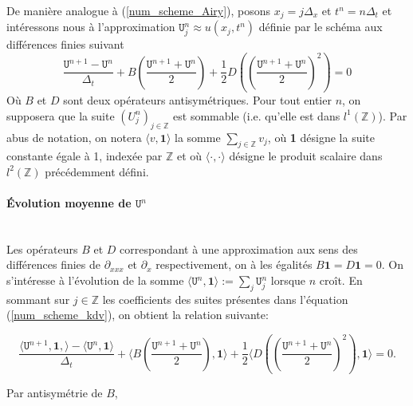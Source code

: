 \documentclass[12pt,a4paper]{article}
\numberwithin{equation}{section}
\begin{document}
De manière analogue à (\ref{num_scheme_Airy}), posons $x_j = j\Delta_x$ et $t^n = n\Delta_t$  et intéressons nous à l'approximation $\texttt{U}^n_j \approx u(x_j,t^n)$ définie par le schéma aux différences finies suivant
\begin{equation}
\frac{\texttt{U}^{n+1}-\texttt{U}^n}{\Delta_t} + B\left(\frac{\texttt{U}^{n+1} + \texttt{U}^{n}}{2}\right) + \frac{1}{2}D\left( \left(\frac{\texttt{U}^{n+1} + \texttt{U}^{n}}{2}\right)^2 \right) = 0 \label{num_scheme_kdv}
\end{equation}
Où $B$ et $D$ sont deux opérateurs antisymétriques. Pour tout entier $n$, on supposera que la suite $(U^n_j)_{j\in\mathbb{Z}}$ est sommable (i.e. qu'elle est dans $l^1(\mathbb{Z})$). Par abus de notation, on notera $\langle v,\textbf{1}\rangle$ la somme $\sum_{j\in\mathbb{Z}}v_j$, où \textbf{1} désigne la suite constante égale à 1, indexée par $\mathbb{Z}$ et où $\langle \cdot,\cdot\rangle$ désigne le produit scalaire dans $l^2(\mathbb{Z})$ précédemment défini.

\paragraph{Évolution moyenne de $\texttt{U}^n$}\,\\

Les opérateurs $B$ et $D$ correspondant à une approximation aux sens des différences finies de $\partial_{xxx}$ et $\partial_x$ respectivement, on à les égalités $B\textbf{1} = D\textbf{1} = 0 $. On s'intéresse à l'évolution de la somme $\langle \texttt{U}^n,\textbf{1}\rangle  := \sum_j \texttt{U}_j^n$ lorsque $n$ croît. En sommant sur $j\in\mathbb{Z}$ les coefficients des suites présentes dans l'équation (\ref{num_scheme_kdv}), on obtient la relation suivante:

\begin{equation*}
    \frac{\langle\texttt{U}^{n+1},\textbf{1},\rangle-\langle\texttt{U}^n,\textbf{1}\rangle}{\Delta_t} + \langle B\left(\frac{\texttt{U}^{n+1} + \texttt{U}^{n}}{2}\right),\textbf{1}\rangle + \frac{1}{2}\langle D\left( \left(\frac{\texttt{U}^{n+1} + \texttt{U}^{n}}{2}\right)^2 \right),\textbf{1}\rangle = 0 .
\end{equation*}

Par antisymétrie de $B$, 
\end{document}
